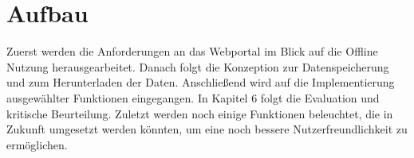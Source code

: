 \section{Aufbau}
Zuerst werden die Anforderungen an das Webportal im Blick auf die Offline Nutzung herausgearbeitet. Danach folgt die Konzeption zur Datenspeicherung und zum Herunterladen der Daten. Anschließend wird auf die Implementierung ausgewählter Funktionen eingegangen. In Kapitel 6 folgt die Evaluation und kritische Beurteilung. Zuletzt werden noch einige Funktionen beleuchtet, die in Zukunft umgesetzt werden könnten, um eine noch bessere Nutzerfreundlichkeit zu ermöglichen.
